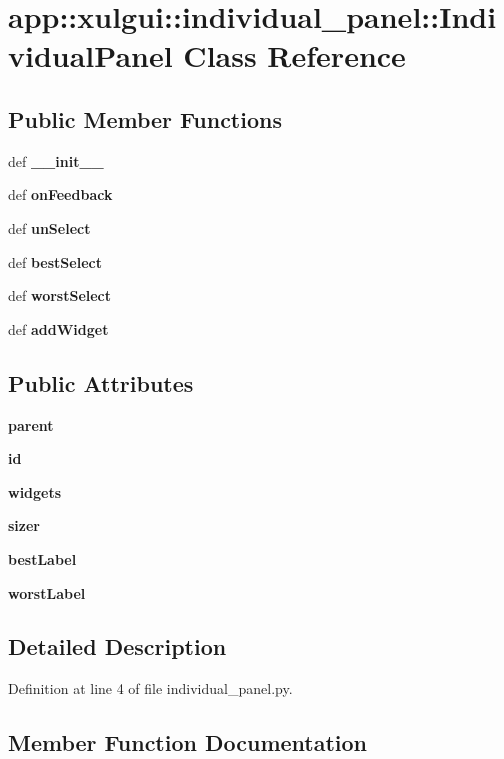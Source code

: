 \section{app::xulgui::individual\_\-panel::IndividualPanel Class Reference}
\label{classapp_1_1xulgui_1_1individual__panel_1_1IndividualPanel}
\subsection*{Public Member Functions}
\begin{CompactItemize}
\item 
def {\bf \_\-\_\-init\_\-\_\-}
\item 
def {\bf onFeedback}
\item 
def {\bf unSelect}
\item 
def {\bf bestSelect}
\item 
def {\bf worstSelect}
\item 
def {\bf addWidget}
\end{CompactItemize}
\subsection*{Public Attributes}
\begin{CompactItemize}
\item 
{\bf parent}
\item 
{\bf id}
\item 
{\bf widgets}
\item 
{\bf sizer}
\item 
{\bf bestLabel}
\item 
{\bf worstLabel}
\end{CompactItemize}


\subsection{Detailed Description}


Definition at line 4 of file individual\_\-panel.py.

\subsection{Member Function Documentation}

